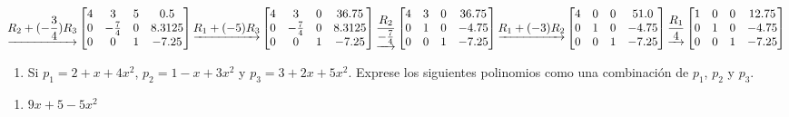 \documentclass[
  11,
]{article}
\providecommand{\tightlist}{%
  \setlength{\itemsep}{0pt}\setlength{\parskip}{0pt}}
\begin{document}
\[\underrightarrow{ R_2 + (- \frac{3}{4})R_3 }
\left[\begin{matrix}4 & 3 & 5 & 0.5\\0 & - \frac{7}{4} & 0 & 8.3125\\0 & 0 & 1 & -7.25\end{matrix}\right]
\underrightarrow{ R_1 + (-5)R_3 }
\\
\left[\begin{matrix}4 & 3 & 0 & 36.75\\0 & - \frac{7}{4} & 0 & 8.3125\\0 & 0 & 1 & -7.25\end{matrix}\right]
\underrightarrow{ \frac{R_2}{- \frac{7}{4}} }
\left[\begin{matrix}4 & 3 & 0 & 36.75\\0 & 1 & 0 & -4.75\\0 & 0 & 1 & -7.25\end{matrix}\right]
\underrightarrow{ R_1 + (-3)R_2 }
\\
\left[\begin{matrix}4 & 0 & 0 & 51.0\\0 & 1 & 0 & -4.75\\0 & 0 & 1 & -7.25\end{matrix}\right]
\underrightarrow{ \frac{R_1}{4} }
\left[\begin{matrix}1 & 0 & 0 & 12.75\\0 & 1 & 0 & -4.75\\0 & 0 & 1 & -7.25\end{matrix}\right]
  \]

\begin{enumerate}
\def\labelenumi{\arabic{enumi}.}
\setcounter{enumi}{1}
\tightlist
\item
  Si \(p_1 = 2 + x + 4x^2\), \(p_2 = 1 - x + 3x^2\) y
  \(p_3 = 3+2x+5x^2\). Exprese los siguientes polinomios como una
  combinación de \(p_1\), \(p_2\) y \(p_3\).
\end{enumerate}

\begin{enumerate}
\def\labelenumi{\alph{enumi})}
\tightlist
\item
  \(9x+5-5x^2\)
\end{enumerate}
\end{document}
